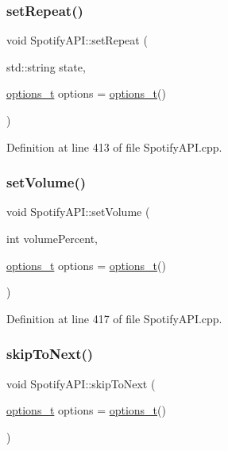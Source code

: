 \subsubsection{\texorpdfstring{set\+Repeat()}{setRepeat()}}
{\footnotesize\ttfamily void Spotify\+A\+P\+I\+::set\+Repeat (\begin{DoxyParamCaption}\item[{std\+::string}]{state,  }\item[{\mbox{\hyperlink{_spotify_a_p_i_8h_a0ff5cac1a4007bb330b7d9939650c283}{options\+\_\+t}}}]{options = {\ttfamily \mbox{\hyperlink{_spotify_a_p_i_8h_a0ff5cac1a4007bb330b7d9939650c283}{options\+\_\+t}}()} }\end{DoxyParamCaption})}



Definition at line 413 of file Spotify\+A\+P\+I.\+cpp.

\mbox{\label{class_spotify_a_p_i_adf7901eeb17f3b94ae8307aaf6ffe307}} 
\subsubsection{\texorpdfstring{set\+Volume()}{setVolume()}}
{\footnotesize\ttfamily void Spotify\+A\+P\+I\+::set\+Volume (\begin{DoxyParamCaption}\item[{int}]{volume\+Percent,  }\item[{\mbox{\hyperlink{_spotify_a_p_i_8h_a0ff5cac1a4007bb330b7d9939650c283}{options\+\_\+t}}}]{options = {\ttfamily \mbox{\hyperlink{_spotify_a_p_i_8h_a0ff5cac1a4007bb330b7d9939650c283}{options\+\_\+t}}()} }\end{DoxyParamCaption})}



Definition at line 417 of file Spotify\+A\+P\+I.\+cpp.

\mbox{\label{class_spotify_a_p_i_ad6eafc052686ba413aa37188882d72c8}} 
\subsubsection{\texorpdfstring{skip\+To\+Next()}{skipToNext()}}
{\footnotesize\ttfamily void Spotify\+A\+P\+I\+::skip\+To\+Next (\begin{DoxyParamCaption}\item[{\mbox{\hyperlink{_spotify_a_p_i_8h_a0ff5cac1a4007bb330b7d9939650c283}{options\+\_\+t}}}]{options = {\ttfamily \mbox{\hyperlink{_spotify_a_p_i_8h_a0ff5cac1a4007bb330b7d9939650c283}{options\+\_\+t}}()} }\end{DoxyParamCaption})}



